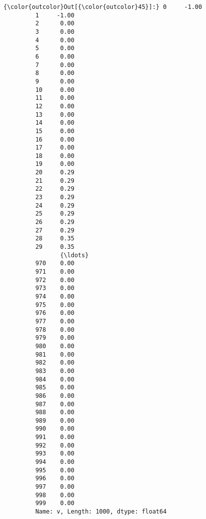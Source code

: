 \documentclass[11pt]{article}
\begin{document}
\begin{Verbatim}[commandchars=\\\{\}]
{\color{outcolor}Out[{\color{outcolor}45}]:} 0     -1.00
         1     -1.00
         2      0.00
         3      0.00
         4      0.00
         5      0.00
         6      0.00
         7      0.00
         8      0.00
         9      0.00
         10     0.00
         11     0.00
         12     0.00
         13     0.00
         14     0.00
         15     0.00
         16     0.00
         17     0.00
         18     0.00
         19     0.00
         20     0.29
         21     0.29
         22     0.29
         23     0.29
         24     0.29
         25     0.29
         26     0.29
         27     0.29
         28     0.35
         29     0.35
                {\ldots} 
         970    0.00
         971    0.00
         972    0.00
         973    0.00
         974    0.00
         975    0.00
         976    0.00
         977    0.00
         978    0.00
         979    0.00
         980    0.00
         981    0.00
         982    0.00
         983    0.00
         984    0.00
         985    0.00
         986    0.00
         987    0.00
         988    0.00
         989    0.00
         990    0.00
         991    0.00
         992    0.00
         993    0.00
         994    0.00
         995    0.00
         996    0.00
         997    0.00
         998    0.00
         999    0.00
         Name: v, Length: 1000, dtype: float64
\end{Verbatim}
            

    
    
    
    
\end{document}
